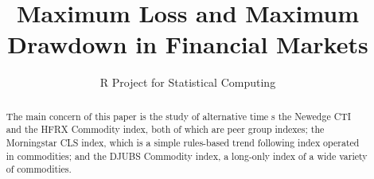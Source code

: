 \documentclass[12pt,letterpaper,english]{article}
\title{Maximum Loss and Maximum Drawdown in Financial Markets}
\author{R Project for Statistical Computing}
\begin{document}


\maketitle


\begin{abstract}
The main concern of this paper is the study of alternative time s the Newedge CTI and the HFRX Commodity index, both of which are peer group indexes; the Morningstar CLS index,
which is a simple rules-based trend following index operated in
commodities; and the DJUBS Commodity index, a long-only index of a wide
variety of commodities.
\end{abstract}
\end{document}
